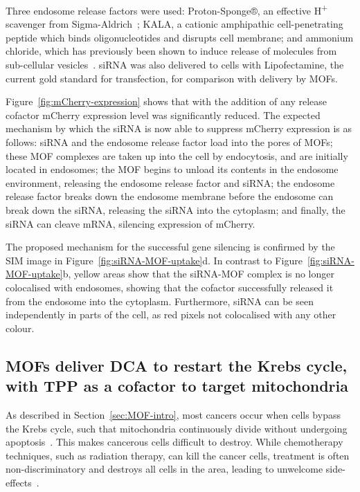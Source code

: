 Three endosome release factors were used: Proton-Sponge®, an effective H\textsuperscript{+} scavenger from Sigma-Aldrich~\cite{ozkar2002nanocluster}; KALA, a cationic amphipathic cell-penetrating peptide which binds oligonucleotides and disrupts cell membrane; and ammonium chloride, which has previously been shown to induce release of molecules from sub-cellular vesicles~\cite{cervia2017distinct}.
siRNA was also delivered to cells with Lipofectamine, the current gold standard for transfection, for comparison with delivery by MOFs. 

Figure~\ref{fig:mCherry-expression} shows that with the addition of any release cofactor mCherry expression level was significantly reduced.
The expected mechanism by which the siRNA is now able to suppress mCherry expression is as follows: siRNA and the endosome release factor load into the pores of MOFs; these MOF complexes are taken up into the cell by endocytosis, and are initially located in endosomes; the MOF begins to unload its contents in the endosome environment, releasing the endosome release factor and siRNA; the endosome release factor breaks down the endosome membrane before the endosome can break down the siRNA, releasing the siRNA into the cytoplasm; and finally, the siRNA can cleave mRNA, silencing expression of mCherry.

The proposed mechanism for the successful gene silencing is confirmed by the SIM image in Figure~\ref{fig:siRNA-MOF-uptake}d.
In contrast to Figure~\ref{fig:siRNA-MOF-uptake}b, yellow areas show that the siRNA-MOF complex is no longer colocalised with endosomes, showing that the cofactor successfully released it from the endosome into the cytoplasm.
Furthermore, siRNA can be seen independently in parts of the cell, as red pixels not colocalised with any other colour.

\subsection{MOFs deliver DCA to restart the Krebs cycle, with TPP as a cofactor to target mitochondria}
As described in Section~\ref{sec:MOF-intro}, most cancers occur when cells bypass the Krebs cycle, such that mitochondria continuously divide without undergoing apoptosis~\cite{murray1993cell}.
This makes cancerous cells difficult to destroy.
While chemotherapy techniques, such as radiation therapy, can kill the cancer cells, treatment is often non-discriminatory and destroys all cells in the area, leading to unwelcome side-effects~\cite{coates1983receiving, de1997patient, minami2010cardiovascular}.

